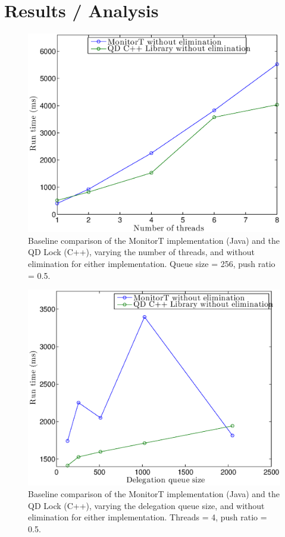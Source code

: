 \section{Results / Analysis}

\begin{figure}[]
\centering
\includegraphics[width=.75\textwidth]{figs/00_TimeVsThreads_cppNoElim_javaNoElim.eps}
\caption[]{Baseline comparison of the MonitorT implementation (Java) and the QD Lock (C++), varying the number of threads, and without elimination for either implementation. Queue size = 256, push ratio = 0.5.}
\label{fig:fig00}
\end{figure}

\begin{figure}[]
\centering
\includegraphics[width=.75\textwidth]{figs/01_TimeVsQDsize_cppNoElim_javaNoElim.eps}
\caption[]{Baseline comparison of the MonitorT implementation (Java) and the QD Lock (C++), varying the delegation queue size, and without elimination for either implementation. Threads = 4, push ratio = 0.5.}
\label{fig:fig01}
\end{figure}

